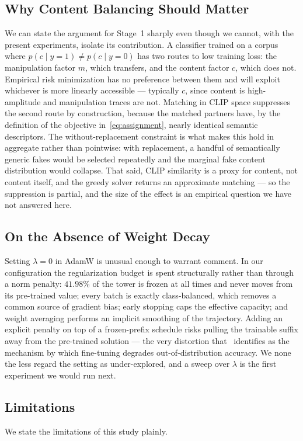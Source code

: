 \documentclass[10pt,journal]{IEEEtran}
\begin{document}
\subsection{Why Content Balancing Should Matter}
We can state the argument for Stage~1 sharply even though we cannot, with the
present experiments, isolate its contribution. A classifier trained on a
corpus where $p(c\mid y{=}1)\neq p(c\mid y{=}0)$ has two routes to low
training loss: the manipulation factor $m$, which transfers, and the content
factor $c$, which does not. Empirical risk minimization has no preference
between them and will exploit whichever is more linearly accessible ---
typically $c$, since content is high-amplitude and manipulation traces are
not. Matching in CLIP space suppresses the second route by construction,
because the matched partners have, by the definition of the objective
in~\eqref{eq:assignment}, nearly identical semantic descriptors. The
without-replacement constraint is what makes this hold in aggregate rather
than pointwise: with replacement, a handful of semantically generic fakes
would be selected repeatedly and the marginal fake content distribution would
collapse. That said, CLIP similarity is a proxy for content, not content
itself, and the greedy solver returns an approximate matching --- so the
suppression is partial, and the size of the effect is an empirical question we
have not answered here.

\subsection{On the Absence of Weight Decay}
Setting $\lambda=0$ in AdamW is unusual enough to warrant comment. In our
configuration the regularization budget is spent structurally rather than
through a norm penalty: $41.98\%$ of the tower is frozen at all times and
never moves from its pre-trained value; every batch is exactly class-balanced,
which removes a common source of gradient bias; early stopping caps the
effective capacity; and weight averaging performs an implicit smoothing of the
trajectory. Adding an explicit penalty on top of a frozen-prefix schedule
risks pulling the trainable suffix away from the pre-trained
solution --- the very distortion that~\cite{kumar2022finetuning} identifies as
the mechanism by which fine-tuning degrades out-of-distribution accuracy. We
none the less regard the setting as under-explored, and a sweep over $\lambda$
is the first experiment we would run next.

\subsection{Limitations}
We state the limitations of this study plainly.
\end{document}
